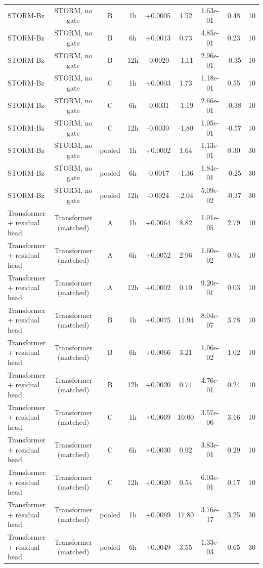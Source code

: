 \begin{tabular}{lcccccccc}
STORM-Bz & STORM, no gate & B & 1h & +0.0005 & 1.52 & 1.63e-01 & 0.48 & 10 \\
STORM-Bz & STORM, no gate & B & 6h & +0.0013 & 0.73 & 4.85e-01 & 0.23 & 10 \\
STORM-Bz & STORM, no gate & B & 12h & -0.0020 & -1.11 & 2.96e-01 & -0.35 & 10 \\
STORM-Bz & STORM, no gate & C & 1h & +0.0003 & 1.73 & 1.18e-01 & 0.55 & 10 \\
STORM-Bz & STORM, no gate & C & 6h & -0.0031 & -1.19 & 2.66e-01 & -0.38 & 10 \\
STORM-Bz & STORM, no gate & C & 12h & -0.0039 & -1.80 & 1.05e-01 & -0.57 & 10 \\
STORM-Bz & STORM, no gate & pooled & 1h & +0.0002 & 1.64 & 1.13e-01 & 0.30 & 30 \\
STORM-Bz & STORM, no gate & pooled & 6h & -0.0017 & -1.36 & 1.84e-01 & -0.25 & 30 \\
STORM-Bz & STORM, no gate & pooled & 12h & -0.0024 & -2.04 & 5.09e-02 & -0.37 & 30 \\
Transformer + residual head & Transformer (matched) & A & 1h & +0.0064 & 8.82 & 1.01e-05 & 2.79 & 10 \\
Transformer + residual head & Transformer (matched) & A & 6h & +0.0052 & 2.96 & 1.60e-02 & 0.94 & 10 \\
Transformer + residual head & Transformer (matched) & A & 12h & +0.0002 & 0.10 & 9.20e-01 & 0.03 & 10 \\
Transformer + residual head & Transformer (matched) & B & 1h & +0.0075 & 11.94 & 8.04e-07 & 3.78 & 10 \\
Transformer + residual head & Transformer (matched) & B & 6h & +0.0066 & 3.21 & 1.06e-02 & 1.02 & 10 \\
Transformer + residual head & Transformer (matched) & B & 12h & +0.0020 & 0.74 & 4.76e-01 & 0.24 & 10 \\
Transformer + residual head & Transformer (matched) & C & 1h & +0.0069 & 10.00 & 3.57e-06 & 3.16 & 10 \\
Transformer + residual head & Transformer (matched) & C & 6h & +0.0030 & 0.92 & 3.83e-01 & 0.29 & 10 \\
Transformer + residual head & Transformer (matched) & C & 12h & +0.0020 & 0.54 & 6.03e-01 & 0.17 & 10 \\
Transformer + residual head & Transformer (matched) & pooled & 1h & +0.0069 & 17.80 & 3.76e-17 & 3.25 & 30 \\
Transformer + residual head & Transformer (matched) & pooled & 6h & +0.0049 & 3.55 & 1.33e-03 & 0.65 & 30 \\

\end{tabular}

